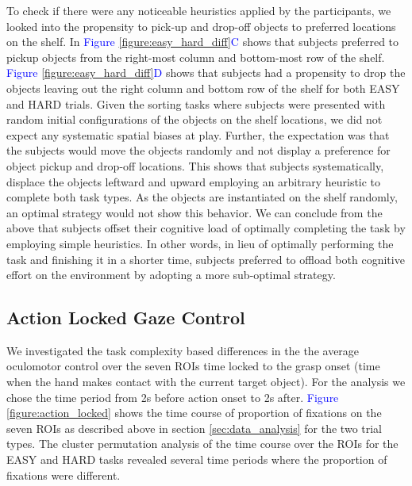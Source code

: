 To check if there were any noticeable heuristics applied by the participants, we looked into the propensity to pick-up and drop-off objects to preferred locations on the shelf. In \textcolor{Blue}{Figure \ref{figure:easy_hard_diff}C} shows that subjects preferred to pickup objects from the right-most column and bottom-most row of the shelf. \textcolor{Blue}{Figure \ref{figure:easy_hard_diff}D} shows that subjects had a propensity to drop the objects leaving out the right column and bottom row of the shelf for both EASY and HARD trials. Given the sorting tasks where subjects were presented with random initial configurations of the objects on the shelf locations, we did not expect any systematic spatial biases at play. Further, the expectation was that the subjects would move the objects randomly and not display a preference for object pickup and drop-off locations. This shows that subjects systematically, displace the objects leftward and upward employing an arbitrary heuristic to complete both task types. As the objects are instantiated on the shelf randomly, an optimal strategy would not show this behavior. We can conclude from the above that subjects offset their cognitive load of optimally completing the task by employing simple heuristics. In other words, in lieu of optimally performing the task and finishing it in a shorter time, subjects preferred to offload both cognitive  effort on the environment by adopting a more sub-optimal strategy.

\subsection{Action Locked Gaze Control}

We investigated the task complexity based differences in the the average oculomotor control over the seven ROIs time locked to the grasp onset (time when the hand makes contact with the current target object). For the analysis we chose the time period from 2s before action onset to 2s after. \textcolor{Blue}{Figure \ref{figure:action_locked}} shows the time course of proportion of fixations on the seven ROIs as described above in section \ref{sec:data_analysis} for the two trial types. The cluster permutation analysis of the time course over the ROIs for the EASY and HARD tasks revealed several time periods where the proportion of fixations were different. 

